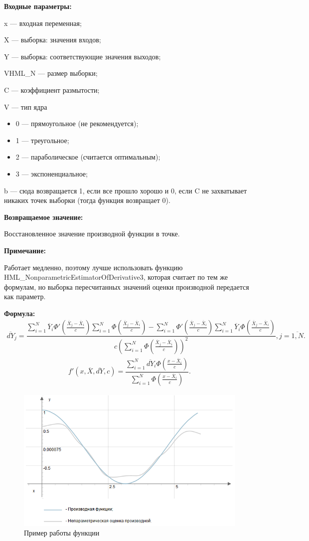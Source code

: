 \textbf{Входные параметры:} 
 
x --- входная переменная;
 
X --- выборка: значения входов;
 
Y --- выборка: соответствующие значения выходов;
 
VHML\_N --- размер выборки;
 
C --- коэффициент размытости;
 
V --- тип ядра
 
 \begin{itemize}
 \item  0 --- прямоугольное (не рекомендуется);
 \item  1 --- треугольное;
 \item  2 --- параболическое (считается оптимальным);
 \item  3 --- экспоненциальное;
 \end{itemize}
 
b --- сюда возвращается 1, если все прошло хорошо и 0, если C не захватывает никаких точек выборки (тогда функция возвращает 0).

\textbf{Возвращаемое значение:}
 
 Восстановленное значение производной функции в точке.
 
\textbf{Примечание:}

Работает медленно, поэтому лучше использовать функцию HML\_NonparametricEstimatorOfDerivative3, которая считает по тем же формулам, но выборка пересчитанных значений оценки производной передается как параметр.

\textbf{Формула:}
\begin{eqnarray*}
\overline{dY}_j =\dfrac{\sum_{i=1}^{N}\overline{Y}_i{\Phi}'\left( \frac{\overline{X}_j-\overline{X}_i}{c}\right) \sum_{i=1}^{N}\Phi\left( \frac{\overline{X}_j-\overline{X}_i}{c}\right)-\sum_{i=1}^{N}{\Phi}'\left( \frac{\overline{X}_j-\overline{X}_i}{c}\right) \sum_{i=1}^{N}\overline{Y}_i\Phi\left( \frac{\overline{X}_j-\overline{X}_i}{c}\right)}{c\left( \sum_{i=1}^{N}\Phi\left( \frac{\overline{X}_j-\overline{X}_i}{c}\right)\right)^2 }, j=\overline{1,N}.
\end{eqnarray*}
\begin{eqnarray*}
{f}'\left( x, \overline{X},\overline{dY}, c\right) =\dfrac{\sum_{i=1}^{N}\overline{dY}_i\Phi\left( \frac{x-\overline{X}_i}{c}\right) }{\sum_{i=1}^{N}\Phi\left( \frac{x-\overline{X}_i}{c}\right) }.
\end{eqnarray*}

 \begin{figure} [h] 
   \center
   \includegraphics {HML_NonparametricEstimatorOfDerivative2.png}
   \caption{Пример работы функции} 
   \label{img:HML_NonparametricEstimatorOfDerivative2}  
 \end{figure}